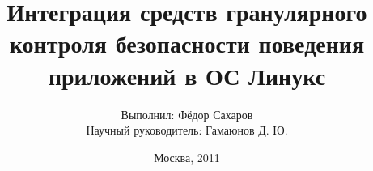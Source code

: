 \documentclass{beamer}
\makeatletter
\def\watermarkoff{\def\beamer@decolines@watermark{}}
\makeatother
\begin{document}
\title{Интеграция средств гранулярного контроля безопасности поведения
        приложений в ОС Линукс}  
\author{\small{Выполнил: Фёдор Сахаров}\\ \small{Научный руководитель:  Гамаюнов Д. Ю.}}
\date{Москва, 2011} 
\begin{frame}[t, plain] 
\watermarkoff
 \titlepage
\end{frame}


\begin{comment}
\begin{frame}{Задача контроля поведения приложения на узлах.}
\watermarkoff
\begin{block}{Контроль поведения приложения на узлах}
 \begin{itemize}
  \item Использование уязвимости в программном обеспечении для получения доступа к системе.
  \item Повышение уровня безопасности за счет дополнения системы механизмами контроля поведения приложений. 
\end{itemize}
\end{block}

\begin{block}{Принципы на которых должен строится контроль поведения приложений}
    \begin{enumerate}
      \item Давать только необходимые привилегии и никакие другие.
      \item Давать привилегии только тем частям программы, которым они действительно нужны.
      \end{enumerate}
\end{block}
\end{frame}

\begin{frame}{Введение в предметную область. SELinux}
\begin{center}
\scalebox{.40}{
\texttt{[image: selinux.png]}
}
\end{center}
\end{frame}




\end{comment}
\end{document}
